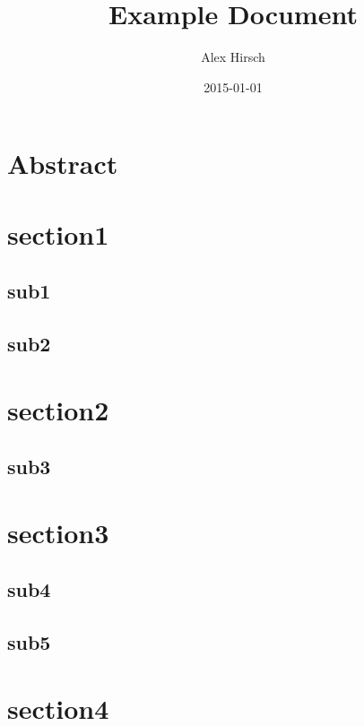 \documentclass[article]{uibk}
\title{Example Document}
\author{Alex Hirsch}
\date{2015-01-01}
\begin{document}
\maketitle

\section*{Abstract}
\label{sec:abstract}

\lipsum[1]

\tableofcontents

\newpage

\section{section1}
\label{sec:section1}

\lipsum[1]

\subsection{sub1}
\label{sub:sub1}

\lipsum[1-3]

\subsection{sub2}
\label{sub:sub2}

\lipsum[1-3]

\section{section2}
\label{sec:section2}

\lipsum[1]

\subsection{sub3}
\label{sub:sub3}

\lipsum[1-5]

\section{section3}
\label{sec:section3}

\lipsum[1]

\subsection{sub4}
\label{sub:sub4}

\lipsum[1-2]

\subsection{sub5}
\label{sub:sub5}

\lipsum[1-2]

\section{section4}
\label{sec:section4}

\lipsum[1-3]
\end{document}
